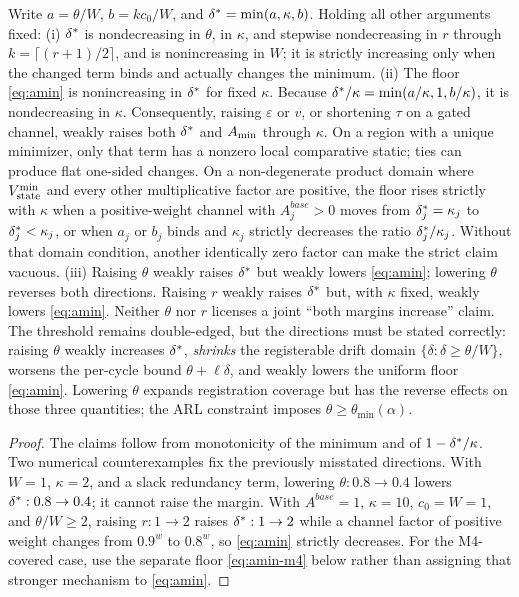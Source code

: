 \begin{proposition}
Write $a=\theta/W$, $b=kc_0/W$, and
$\delta^{*}=\min(a,\kappa,b)$. Holding all other arguments fixed:
\textup{(i)} $\delta^{*}$ is nondecreasing in $\theta$, in $\kappa$, and
stepwise nondecreasing in $r$ through $k=\lceil(r+1)/2\rceil$, and is
nonincreasing in $W$; it is strictly increasing only when the changed term
binds and actually changes the minimum. \textup{(ii)} The floor
\eqref{eq:amin} is nonincreasing in $\delta^{*}$ for fixed $\kappa$.
Because $\delta^{*}/\kappa=\min(a/\kappa,1,b/\kappa)$, it is nondecreasing
in $\kappa$. Consequently, raising $\varepsilon$ or $v$, or shortening
$\tau$ on a gated channel, weakly raises both $\delta^{*}$ and $A_{\min}$
through $\kappa$. On a region with a unique minimizer, only that term has a
nonzero local comparative static; ties can produce flat one-sided changes.
On a non-degenerate product domain where $V_{\mathrm{state}}^{\min}$ and every other
multiplicative factor are positive, the floor rises strictly with $\kappa$
when a positive-weight channel with $A_j^{base}>0$ moves from
$\delta^{*}_j=\kappa_j$ to $\delta^{*}_j<\kappa_j$, or when $a_j$ or $b_j$
binds and $\kappa_j$ strictly decreases the ratio $\delta^{*}_j/\kappa_j$.
Without that domain condition, another identically zero factor can make the
strict claim vacuous.
\textup{(iii)} Raising $\theta$ weakly raises $\delta^{*}$ but weakly lowers
\eqref{eq:amin}; lowering $\theta$ reverses both directions. Raising $r$
weakly raises $\delta^{*}$ but, with $\kappa$ fixed, weakly lowers
\eqref{eq:amin}. Neither $\theta$ nor $r$ licenses a joint ``both margins
increase'' claim. The threshold remains double-edged, but the directions
must be stated correctly: raising $\theta$ weakly increases $\delta^{*}$,
\emph{shrinks} the registerable drift domain $\{\delta:\delta\ge\theta/W\}$,
worsens the per-cycle bound $\theta+\ell\delta$, and weakly lowers the
uniform floor \eqref{eq:amin}. Lowering $\theta$ expands registration
coverage but has the reverse effects on those three quantities; the ARL
constraint imposes $\theta\ge\theta_{\min}(\alpha)$.
\end{proposition}
\begin{proof}
The claims follow from monotonicity of the minimum and of
$1-\delta^{*}/\kappa$. Two numerical counterexamples fix the previously
misstated directions. With $W=1$, $\kappa=2$, and a slack redundancy term,
lowering $\theta:0.8\to0.4$ lowers $\delta^{*}:0.8\to0.4$; it cannot raise
the margin. With $A^{base}=1$, $\kappa=10$, $c_0=W=1$, and
$\theta/W\ge2$, raising $r:1\to2$ raises $\delta^{*}:1\to2$ while a channel
factor of positive weight changes from $0.9^w$ to $0.8^w$, so
\eqref{eq:amin} strictly decreases. For the M4-covered case, use the
separate floor \eqref{eq:amin-m4} below rather than assigning that stronger
mechanism to \eqref{eq:amin}.
\end{proof}

